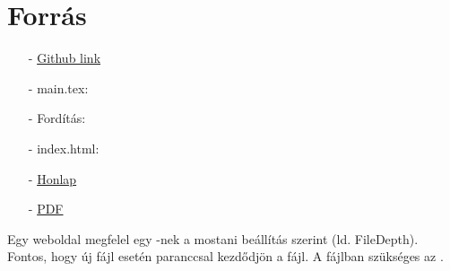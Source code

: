 \chapter{Forr\'as}

\begin{enumerate}
    \item[-] \href{https://github.com/a-gondolkodas-orome/latex-tutorial}{Github link} 
    \item[-] main.tex: 
    \item[-] Fordítás:  
    \item[-] index.html:  
    \item[-] \href{https://a-gondolkodas-orome.github.io/latex-tutorial/index.html}{Honlap}
    \item[-] \href{https://a-gondolkodas-orome.github.io/latex-tutorial/mainpage.pdf}{PDF}
\end{enumerate}
        
Egy weboldal megfelel egy \code{\chapter}-nek a mostani beállítás szerint (ld. FileDepth). Fontos, hogy új fájl esetén  paranccsal kezdődjön a fájl. A  fájlban szükséges az \code{}.

